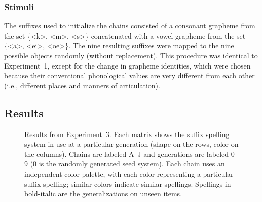 \documentclass[doc,biblatex]{apa7}
\begin{document}
\subsubsection{Stimuli}

The suffixes used to initialize the chains consisted of a consonant grapheme from the set \{<k>, <m>, <s>\} concatenated with a vowel grapheme from the set \{<a>, <ei>, <oe>\}. The nine resulting suffixes were mapped to the nine possible objects randomly (without replacement). This procedure was identical to Experiment~1, except for the change in grapheme identities, which were chosen because their conventional phonological values are very different from each other (i.e., different places and manners of articulation).

\subsection{Results}

	\begin{figure}
	\vspace*{2pt}
	\caption{Results from Experiment~3. Each matrix shows the suffix spelling system in use at a particular generation (shape on the rows, color on the columns). Chains are labeled A--J and generations are labeled 0–9 (0 is the randomly generated seed system). Each chain uses an independent color palette, with each color representing a particular suffix spelling; similar colors indicate similar spellings. Spellings in bold-italic are the generalizations on unseen items.}
	\label{sil_com}
	\end{figure}
\end{document}
